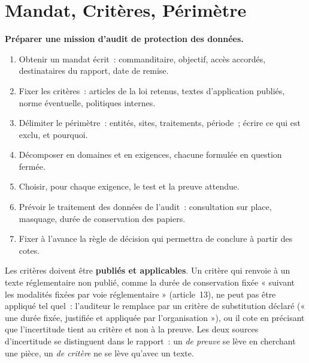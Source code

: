 \section{Mandat, Critères, Périmètre}
\label{sec:c03-mandat}

\begin{boxprocedure}
\textbf{Préparer une mission d'audit de protection des données.}
\begin{enumerate}
    \item Obtenir un mandat écrit~: commanditaire, objectif, accès accordés,
          destinataires du rapport, date de remise.
    \item Fixer les critères~: articles de la loi retenus, textes
          d'application publiés, norme éventuelle, politiques internes.
    \item Délimiter le périmètre~: entités, sites, traitements, période~;
          écrire ce qui est exclu, et pourquoi.
    \item Décomposer en domaines et en exigences, chacune formulée en
          question fermée.
    \item Choisir, pour chaque exigence, le test et la preuve attendue.
    \item Prévoir le traitement des données de l'audit~: consultation sur
          place, masquage, durée de conservation des papiers.
    \item Fixer à l'avance la règle de décision qui permettra de conclure à
          partir des cotes.
\end{enumerate}
\end{boxprocedure}

Les critères doivent être \textbf{publiés et applicables}. Un critère qui
renvoie à un texte réglementaire non publié, comme la durée de conservation
fixée « suivant les modalités fixées par voie réglementaire »
(article~13), ne peut pas être appliqué tel quel~: l'auditeur le remplace
par un critère de substitution déclaré (« une durée fixée, justifiée et
appliquée par l'organisation »), ou il cote \NEK{} en précisant que
l'incertitude tient au critère et non à la preuve. Les deux sources
d'incertitude se distinguent dans le rapport~: un \NEK{} \textit{de
preuve} se lève en cherchant une pièce, un \NEK{} \textit{de critère} ne se
lève qu'avec un texte.

